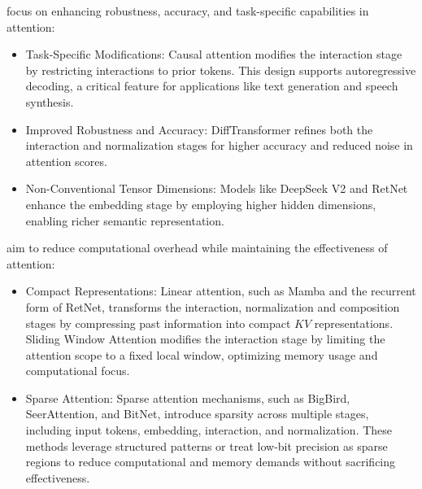  focus on enhancing robustness, accuracy, and task-specific capabilities in attention:
\begin{itemize}[noitemsep,topsep=0pt, left=0pt]
    \item Task-Specific Modifications: Causal attention\cite{Ashish17AttentionIsAllYouNeed} modifies the interaction stage by restricting interactions to prior tokens. This design supports autoregressive decoding, a critical feature for applications like text generation and speech synthesis.
    \item Improved Robustness and Accuracy: DiffTransformer\cite{ye2024differentialtransformer} refines both the interaction and normalization stages for higher accuracy and reduced noise in attention scores.
    \item Non-Conventional Tensor Dimensions: Models like DeepSeek V2\cite{deepseekai2024deepseekv2strongeconomicalefficient} and RetNet\cite{sun2023retentive} enhance the embedding stage by employing higher hidden dimensions, enabling richer semantic representation.
\end{itemize}

aim to reduce computational overhead while maintaining the effectiveness of attention:
\begin{itemize}[noitemsep,topsep=0pt, left=0pt]
    \item Compact Representations: Linear attention, such as Mamba\cite{dao2024mamba2} and the recurrent form of RetNet\cite{sun2023retentive}, transforms the interaction, normalization and composition stages by compressing past information into compact $KV$ representations. Sliding Window Attention\cite{beltagy2020longformerlongdocumenttransformer} modifies the interaction stage by limiting the attention scope to a fixed local window, optimizing memory usage and computational focus.
    \item Sparse Attention: Sparse attention mechanisms, such as BigBird\cite{zaheer2021bigbirdtransformerslonger}, SeerAttention\cite{gao2024seerattentionlearningintrinsicsparse}, and BitNet\cite{wang2023bitnetscaling1bittransformers}, introduce sparsity across multiple stages, including input tokens, embedding, interaction, and normalization. These methods leverage structured patterns or treat low-bit precision as sparse regions to reduce computational and memory demands without sacrificing effectiveness.
\end{itemize}

